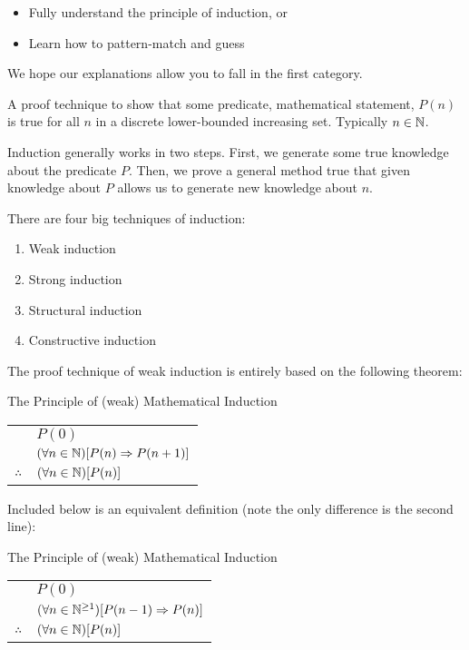 \documentclass[main.tex]{subfiles}
\begin{document}
\begin{itemize}
	\item Fully understand the principle of induction, or
	\item Learn how to pattern-match and guess
\end{itemize}

We hope our explanations allow you to fall in the first category.

\begin{defn}
	A proof technique to show that some predicate, mathematical statement, \(P(n)\) is true for all \(n\) in a discrete lower-bounded increasing set. Typically \(n \in \mathbb{N}\). 
	
	Induction generally works in two steps. First, we generate some true knowledge about the predicate \(P\). Then, we prove a general method true that given knowledge about \(P\) allows us to generate new knowledge about \(n\).
\end{defn}

There are four big techniques of induction:

\begin{enumerate}
	\item Weak induction
	\item Strong induction
	\item Structural induction
	\item Constructive induction
\end{enumerate}

\sectionbreak

The proof technique of weak induction is entirely based on the following theorem:

\begin{thm}{The Principle of (weak) Mathematical Induction \label{pmi-1}}
	\begin{center}
		\begin{tabular}{rl}
			& \(P(0)\) \\
			& \((\forall n \in \mathbb{N})[P(n) \Rightarrow P(n+1)]\) \\
			\midrule
			\(\therefore\) & \((\forall n \in \mathbb{N})[P(n)]\) \\
		\end{tabular}
	\end{center}
\end{thm}

Included below is an equivalent definition (note the only difference is the second line):

\begin{thm}{The Principle of (weak) Mathematical Induction \label{pmi-2}}
	\begin{center}
		\begin{tabular}{rl}
			& \(P(0)\) \\
			& \((\forall n \in \mathbb{N}^{\geq 1})[P(n-1) \Rightarrow P(n)]\) \\
			\midrule
			\(\therefore\) & \((\forall n \in \mathbb{N})[P(n)]\) \\
		\end{tabular}
	\end{center}
\end{thm}
\end{document}
